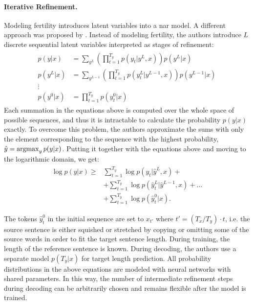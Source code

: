 \paragraph{Iterative Refinement.} Modeling fertility introduces latent
variables into a \acl{nar} model. A different approach was proposed by
\citet{lee-etal-2018-deterministic}. Instead of modeling fertility, the authors
introduce $L$ discrete sequential latent variables interpreted as stages of
refinement:
%
\begin{align}
  \begin{split}
    p(y|x) & = \sum_{y^L}
      \left( \prod_{t=1}^{T_y} p(y_t|y^L, x) \right) p(y^L|x) \\
    p(y^L|x) & = \sum_{y^{L-1}}
      \left( \prod_{t=1}^{T_y} p(y_t^L | y^{L-1}, x) \right)
      p(y^{L-1}|x) \\
    \vdots \\
    p(y^0|x) & = \prod_{t=1}^{T_y} p(y_t^0|x)
  \end{split}
\end{align}
%
Each summation in the equations above is computed over the whole space of
possible sequences, and thus it is intractable to calculate the probability
$p(y|x)$ exactly. To overcome this problem, the authors approximate the sums
with only the element corresponding to the sequence with the highest
probability, $\hat{y} = \operatorname*{argmax}_{y}p(y|x)$. Putting it together with the
equations above and moving to the logarithmic domain, we get:
\begin{align}
  \begin{split}
    \log p(y|x) \geq
    & \sum_{t=1}^{T_y} \log p(y_t| \hat{y}^L, x) + \\
    & + \sum_{t=1}^{T_y} \log p(\hat{y}_t^{L}| \hat{y}^{L-1}, x) + \ldots \\
    & + \sum_{t=1}^{T_y} \log p(\hat{y}_t^0 | x). \label{eq:refinement-lowerbound}
  \end{split}
\end{align}

The tokens $\hat{y}_t^0$ in the initial sequence are set to $x_{t'}$ where
$t' = (T_x / T_y) \cdot t$, i.e. the source sentence is either squished or
stretched by copying or omitting some of the source words in order to fit the
target sentence length. During training, the length of the reference sentence
is known. During decoding, the authors use a separate model $p(T_y|x)$ for
target length prediction. All probability distributions in the above equations
are modeled with neural networks with shared parameters. In this way, the
number of intermediate refinement steps during decoding can be arbitrarily
chosen and remains flexible after the model is trained.

